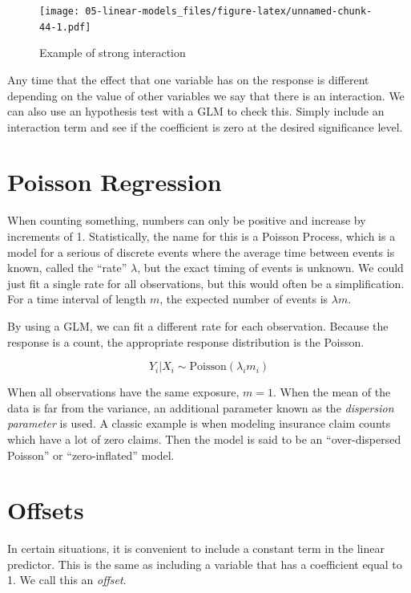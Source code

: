 \documentclass[openany]{book}
\begin{document}
\begin{figure}
\centering
\texttt{[image: 05-linear-models\_files/figure-latex/unnamed-chunk-44-1.pdf]}
\caption{\label{fig:unnamed-chunk-44}Example of strong interaction}
\end{figure}

Any time that the effect that one variable has on the response is different depending on the value of other variables we say that there is an interaction. We can also use an hypothesis test with a GLM to check this. Simply include an interaction term and see if the coefficient is zero at the desired significance level.

\hypertarget{poisson-regression}{%
\section{Poisson Regression}\label{poisson-regression}}

When counting something, numbers can only be positive and increase by increments of 1. Statistically, the name for this is a Poisson Process, which is a model for a serious of discrete events where the average time between events is known, called the ``rate'' \(\lambda\), but the exact timing of events is unknown. We could just fit a single rate for all observations, but this would often be a simplification. For a time interval of length \(m\), the expected number of events is \(\lambda m\).

By using a GLM, we can fit a different rate for each observation. Because the response is a count, the appropriate response distribution is the Poisson.

\[Y_i|X_i \sim \text{Poisson}(\lambda_i m_i)\]

When all observations have the same exposure, \(m = 1\). When the mean of the data is far from the variance, an additional parameter known as the \emph{dispersion parameter} is used. A classic example is when modeling insurance claim counts which have a lot of zero claims. Then the model is said to be an ``over-dispersed Poisson'' or ``zero-inflated'' model.

\hypertarget{offsets}{%
\section{Offsets}\label{offsets}}

In certain situations, it is convenient to include a constant term in the linear predictor. This is the same as including a variable that has a coefficient equal to 1. We call this an \emph{offset}.
\end{document}
